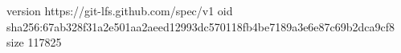 version https://git-lfs.github.com/spec/v1
oid sha256:67ab328f31a2e501aa2aeed12993dc570118fb4be7189a3e6e87c69b2dca9cf8
size 117825
